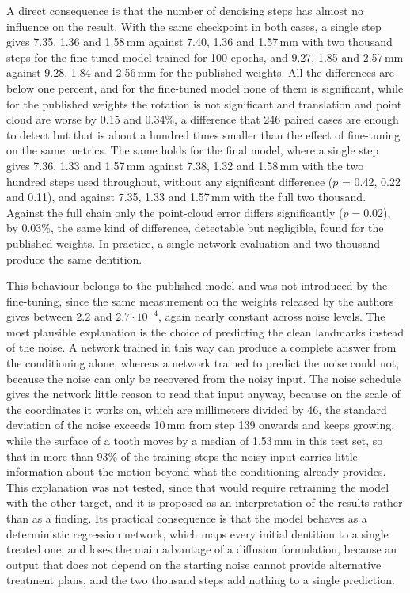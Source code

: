 \documentclass[10pt,a4paper]{article}
\begin{document}
A direct consequence is that the number of denoising steps has almost no influence on the result. With the same checkpoint in both cases, a single step gives 7.35\degree{}, 1.36 and 1.58\,mm against 7.40\degree{}, 1.36 and 1.57\,mm with two thousand steps for the fine-tuned model trained for 100 epochs, and 9.27\degree{}, 1.85 and 2.57\,mm against 9.28\degree{}, 1.84 and 2.56\,mm for the published weights. All the differences are below one percent, and for the fine-tuned model none of them is significant, while for the published weights the rotation is not significant and translation and point cloud are worse by 0.15 and 0.34\%, a difference that 246 paired cases are enough to detect but that is about a hundred times smaller than the effect of fine-tuning on the same metrics. The same holds for the final model, where a single step gives 7.36\degree{}, 1.33 and 1.57\,mm against 7.38\degree{}, 1.32 and 1.58\,mm with the two hundred steps used throughout, without any significant difference ($p$ = 0.42, 0.22 and 0.11), and against 7.35\degree{}, 1.33 and 1.57\,mm with the full two thousand. Against the full chain only the point-cloud error differs significantly ($p = 0.02$), by 0.03\%, the same kind of difference, detectable but negligible, found for the published weights. In practice, a single network evaluation and two thousand produce the same dentition.

This behaviour belongs to the published model and was not introduced by the fine-tuning, since the same measurement on the weights released by the authors gives between $2.2$ and $2.7\cdot10^{-4}$, again nearly constant across noise levels. The most plausible explanation is the choice of predicting the clean landmarks instead of the noise. A network trained in this way can produce a complete answer from the conditioning alone, whereas a network trained to predict the noise could not, because the noise can only be recovered from the noisy input. The noise schedule gives the network little reason to read that input anyway, because on the scale of the coordinates it works on, which are millimeters divided by 46, the standard deviation of the noise exceeds 10\,mm from step 139 onwards and keeps growing, while the surface of a tooth moves by a median of 1.53\,mm in this test set, so that in more than 93\% of the training steps the noisy input carries little information about the motion beyond what the conditioning already provides. This explanation was not tested, since that would require retraining the model with the other target, and it is proposed as an interpretation of the results rather than as a finding. Its practical consequence is that the model behaves as a deterministic regression network, which maps every initial dentition to a single treated one, and loses the main advantage of a diffusion formulation, because an output that does not depend on the starting noise cannot provide alternative treatment plans, and the two thousand steps add nothing to a single prediction.
\end{document}
